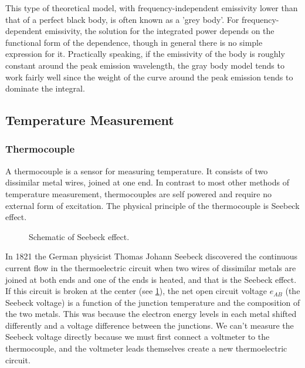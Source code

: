 This type of theoretical model, with frequency-independent emissivity lower than that of a perfect black body, is often known as a 'grey body'. For frequency-dependent emissivity, the solution for the integrated power depends on the functional form of the dependence, though in general there is no simple expression for it. Practically speaking, if the emissivity of the body is roughly constant around the peak emission wavelength, the gray body model tends to work fairly well since the weight of the curve around the peak emission tends to dominate the integral.

\subsection{Temperature Measurement}
\subsubsection{Thermocouple}
A thermocouple is a sensor for measuring temperature.
It consists of two dissimilar metal wires, joined at one end.
In contrast to most other methods of temperature measurement, thermocouples are self powered and require no external form of excitation.
The physical principle of the thermocouple is Seebeck effect.

\begin{figure}[!htp]
\centering{}
\caption{Schematic of Seebeck effect.}
\label{Fig:Seebeck_Voltage}
\end{figure}
In 1821 the German physicist Thomas Johann Seebeck discovered the continuous current flow in the thermoelectric circuit when two wires of dissimilar metals are joined at both ends and one of the ends is heated, and that is the Seebeck effect.
If this circuit is broken at the center (see \ref{Fig:Seebeck_Voltage}), the net open circuit voltage $e_{AB}$ (the Seebeck voltage) is a function of the junction temperature and the composition of the two metals.
This was because the electron energy levels in each metal shifted differently and a voltage difference between the junctions.
We can't measure the Seebeck voltage directly because we must first connect a voltmeter to the thermocouple, and the voltmeter leads themselves create a new thermoelectric circuit.


